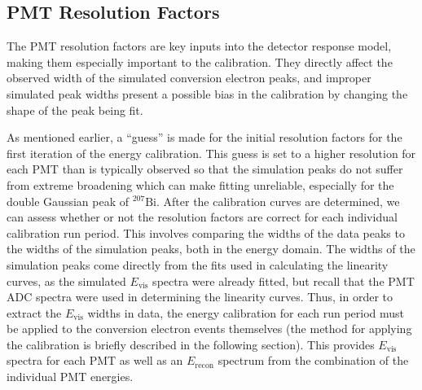 \subsection{PMT Resolution Factors} \label{ssec:PMTresolution}

The PMT resolution factors are key inputs into the detector response model, making them especially
important to the calibration. They directly affect the observed width of the simulated conversion
electron peaks, and improper simulated peak widths present a possible bias in the calibration by changing
the shape of the peak being fit.

As mentioned earlier, a ``guess'' is made for the initial resolution factors for the first iteration
of the energy calibration. This guess is set to a higher resolution for each PMT than is typically observed so that
the simulation peaks do not suffer from extreme broadening which can make fitting unreliable, especially for
the double Gaussian peak of $^{207}\mathrm{Bi}$. After the calibration curves are determined, we can assess
whether or not the resolution factors are correct for each individual calibration run period.
This involves comparing the widths
of the data peaks to the widths of the simulation peaks, both in the energy domain. The widths of the simulation
peaks come directly from the fits used in calculating the linearity curves, as the simulated $E_{\mathrm{vis}}$
spectra were already fitted, but recall that the PMT ADC spectra were used in determining the linearity curves. Thus, in order
to extract the $E_{\mathrm{vis}}$ widths in data, the energy calibration for each run period must be applied
to the conversion electron events themselves (the method for applying the
calibration is briefly described in the following section). This provides $E_{\mathrm{vis}}$ spectra for each PMT as well as
an $E_{\mathrm{recon}}$ spectrum from the combination of the individual PMT energies.


